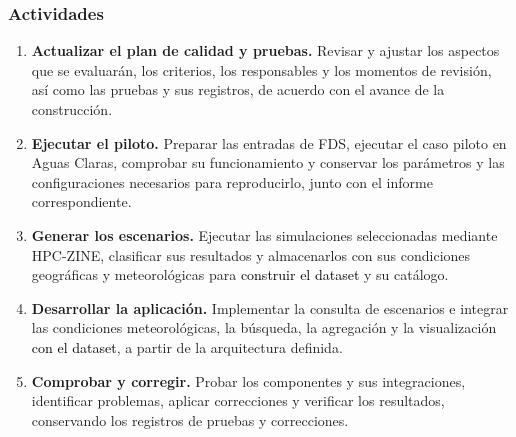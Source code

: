 \subsubsection{Actividades}\label{sec:construccion-actividades}

\begin{enumerate}
    \item \textbf{Actualizar el plan de calidad y pruebas.}
    Revisar y ajustar los aspectos que se evaluarán, los criterios,
    los responsables y los momentos de revisión, así como las
    pruebas y sus registros, de acuerdo con el avance de la
    construcción.

    \item \textbf{Ejecutar el piloto.}
    Preparar las entradas de FDS, ejecutar el caso piloto en
    Aguas Claras, comprobar su funcionamiento y conservar los
    parámetros y las configuraciones necesarios para reproducirlo,
    junto con el informe correspondiente.

    \item \textbf{Generar los escenarios.}
    Ejecutar las simulaciones seleccionadas mediante HPC-ZINE,
    clasificar sus resultados y almacenarlos con sus condiciones
    geográficas y meteorológicas para \textcolor{black}{construir el dataset}
    y su catálogo.

    \item \textbf{Desarrollar la aplicación.}
    Implementar la consulta de escenarios e integrar las
    condiciones meteorológicas, la búsqueda, la agregación y la
    visualización \textcolor{black}{con el dataset}, a partir de la arquitectura
    definida.

    \item \textbf{Comprobar y corregir.}
    Probar los componentes y sus integraciones, identificar
    problemas, aplicar correcciones y verificar los resultados,
    conservando los registros de pruebas y correcciones.
\end{enumerate}
